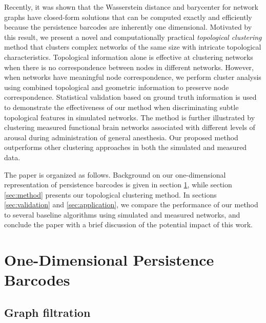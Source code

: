 \documentclass{article} %
\begin{document}
Recently, it was shown that the Wasserstein distance and barycenter for network graphs have closed-form solutions that can be computed exactly and efficiently \citep{songdechakraiwut2021topological} because the persistence barcodes are inherently one dimensional.
Motivated by this result, we present a novel and computationally practical {\em topological clustering} method that clusters complex networks of the same size with intricate topological characteristics. 
Topological information alone is effective at clustering networks when there is no correspondence between nodes in different networks. However, when networks have meaningful node correspondence, we perform cluster analysis using combined topological and geometric information to preserve node correspondence.
Statistical validation based on ground truth information is used to demonstrate the effectiveness of our method when discriminating subtle topological features in simulated networks.
The method is further illustrated by clustering measured functional brain networks associated with different levels of arousal during administration of general anesthesia. Our proposed method outperforms other clustering approaches in both the simulated and measured data.

The paper is organized as follows. Background on our one-dimensional representation of persistence barcodes is given in section \ref{sec:prelim}, while section \ref{sec:method} presents our topological clustering method. In sections \ref{sec:validation} and \ref{sec:application}, we compare the performance of our method to several baseline algorithms using simulated and measured networks, and conclude the paper with a brief discussion of the potential impact of this work.



\section{One-Dimensional Persistence Barcodes}
\label{sec:prelim}

\subsection{Graph filtration}
\end{document}
